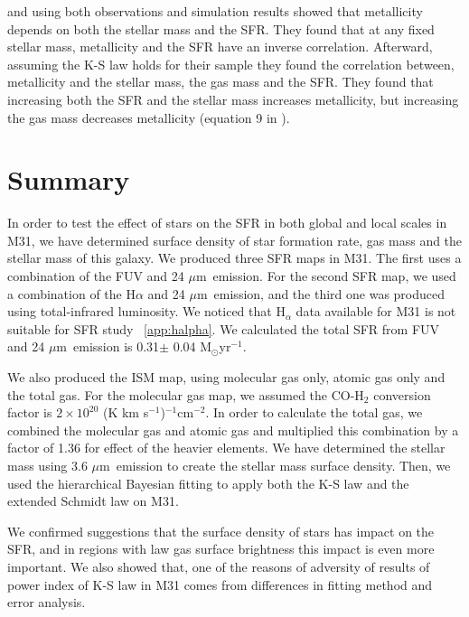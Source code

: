 \documentclass[useAMS,usenatbib]{mn2e}
\newcommand \um    {$\mu$m\ }
\begin{document}
\cite{Mannucci10} and \cite{Lilly13} using both observations and simulation results showed that metallicity depends on both the stellar mass and the SFR. They found that at any fixed stellar mass, metallicity and the SFR have an inverse correlation. Afterward, assuming the K-S law holds for their sample they found the correlation between, metallicity and the stellar mass, the gas mass and the SFR. They found that increasing both the SFR and the stellar mass increases metallicity, but increasing the gas mass decreases metallicity (equation 9 in \citep{Mannucci10}).


\section{Summary}

In order to test the effect of stars on the SFR in both global and local scales in M31, we have determined surface density of star formation rate, gas mass and the stellar mass of this galaxy. We produced three SFR maps in M31. The first uses a combination of the FUV and 24 \um emission. For the second SFR map, we used a combination of the H$\alpha$ and 24 \um emission, and the third one was produced using total-infrared luminosity. We noticed that H$_\alpha$ data available for M31 is not suitable for SFR study ~\ref{app:halpha}. We calculated the total SFR from FUV and 24 \um emission is 0.31$\pm$ 0.04 M$_{\odot}$yr$^{-1}$.

We also produced the ISM map, using molecular gas only, atomic gas only and the total gas. %
For the molecular gas map, we assumed the CO-H$_2$ conversion factor is $2 \times 10^{20}$ (K km s$^{-1}$)$^{-1}$cm$^{-2}$. 
In order to calculate the total gas, we combined the molecular gas and atomic gas and multiplied this combination by a factor of 1.36 for effect of the heavier elements. We have determined the stellar mass using 3.6 \um emission to create the stellar mass surface density. Then, we used the hierarchical Bayesian fitting to apply both the K-S law and the extended Schmidt law on M31.

We confirmed \cite{Shi11} suggestions that the surface density of stars has impact on the SFR, and in regions with law gas surface brightness this impact is even more important. We also showed that, one of the reasons of adversity of results of power index of K-S law in M31 comes from differences in fitting method and error analysis. %
\end{document}
